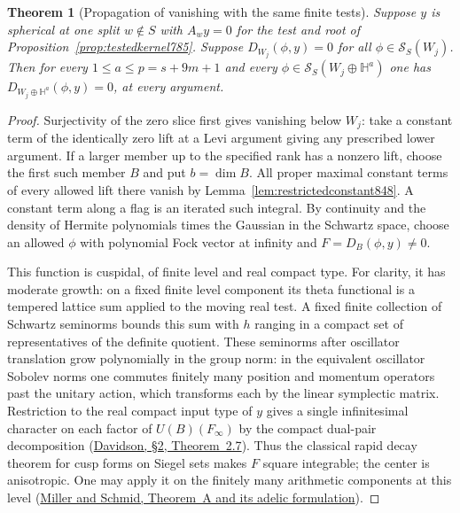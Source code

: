 \documentclass[a4paper,11pt]{article}
\newtheorem{theorem}[proposition]{Theorem}
\theoremstyle{definition}
\theoremstyle{remark}
\numberwithin{equation}{section}
\begin{document}
\begin{theorem}[Propagation of vanishing with the same finite tests]
\leavevmode\label{thm:restrictedtower848}
Suppose \(y\) is spherical at one split \(w\notin S\) with
\(A_w y=0\) for the test and root of
Proposition~\ref{prop:testedkernel785}. Suppose
\(D_{W_j}(\phi,y)=0\) for all \(\phi\in\mathcal S_S(W_j)\).
Then for every \(1\le a\le p=s+9m+1\) and every
\(\phi\in\mathcal S_S(W_j\oplus\mathbb H^a)\) one has
\(D_{W_j\oplus\mathbb H^a}(\phi,y)=0\), at every argument.
\end{theorem}
\begin{proof}
Surjectivity of the zero slice first gives vanishing below
\(W_j\): take a constant term of the identically zero lift
at a Levi argument giving any prescribed lower argument.
If a larger member up to the specified rank has a nonzero
lift, choose the first such member \(B\) and put \(b=\dim B\).
All proper maximal constant terms of every allowed lift there
vanish by Lemma~\ref{lem:restrictedconstant848}. A constant
term along a flag is an iterated such integral. By continuity
and the density of Hermite polynomials times the Gaussian in
the Schwartz space, choose an allowed \(\phi\) with polynomial
Fock vector at infinity and \(F=D_B(\phi,y)\ne0\).

This function is cuspidal, of finite level and real compact
type. For clarity, it has moderate growth: on a fixed finite
level component its theta functional is a tempered lattice
sum applied to the moving real test. A fixed finite collection
of Schwartz seminorms bounds this sum with \(h\) ranging in
a compact set of representatives of the definite quotient.
These seminorms after oscillator translation grow polynomially
in the group norm: in the equivalent oscillator Sobolev norms
one commutes finitely many position and momentum operators
past the unitary action, which transforms each by the linear
symplectic matrix. Restriction to the real compact input
type of \(y\) gives a single infinitesimal character on each
factor of \(U(B)(F_\infty)\) by the compact dual-pair
decomposition (\href{https://msp.org/pjm/1987/129-1/pjm-v129-n1-p02-s.pdf}
{Davidson, \S2, Theorem~2.7}). Thus the classical rapid decay
theorem for cusp forms on Siegel sets makes \(F\) square
integrable; the center is anisotropic. One may apply it on the
finitely many arithmetic components at this level
(\href{https://arxiv.org/pdf/1106.2149}{Miller and Schmid,
Theorem~A and its adelic formulation}).


\end{proof}
\end{document}
